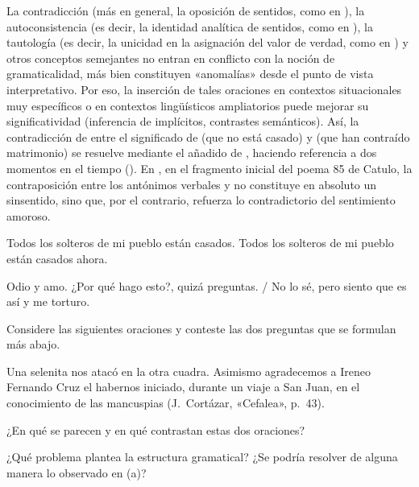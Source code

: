La contradicción (más en general, la oposición de sentidos, como en ), la autoconsistencia (es decir, la identidad
analítica de sentidos, como en ), la
tautología (es decir, la unicidad en la asignación del valor de verdad, como en
) y otros conceptos semejantes no entran en conflicto
con la noción de gramaticalidad, más bien constituyen «anomalías» desde el punto
de vista interpretativo. Por eso, la inserción de tales oraciones en contextos
situacionales muy específicos o en contextos lingüísticos ampliatorios puede
mejorar su significatividad (inferencia de implícitos, contrastes semánticos).
Así, la contradicción de  entre el significado de
 (que no está casado) y  (que han contraído
matrimonio) se resuelve mediante el añadido de 
, haciendo referencia a dos momentos en el tiempo
(). En
, en el fragmento inicial del poema 85 de Catulo, la
contraposición entre los antónimos verbales  y  no
constituye en absoluto un sinsentido, sino que, por el contrario, refuerza lo
contradictorio del sentimiento amoroso.

\begin{exe}
  \ex\label{ex:02-solteros}
    \begin{xlist}
      \ex\label{ex:02-solteros-a} Todos los solteros de mi pueblo están casados.
      \ex\label{ex:02-solteros-b} Todos los solteros de mi pueblo están casados
          ahora.
    \end{xlist}
  \ex\label{ex:02-catulo} Odio y amo. ¿Por qué hago esto?, quizá preguntas. / No
      lo sé, pero siento que es así y me torturo.
\end{exe}

\begin{ejercicio}\label{ej:02-referencia}
Considere las siguientes oraciones y conteste las dos preguntas que se formulan
más abajo.

\begin{exe}
  \ex Una selenita nos atacó en la otra cuadra.
  \ex Asimismo agradecemos a Ireneo Fernando Cruz el habernos iniciado, durante
      un viaje a San Juan, en el conocimiento de las mancuspias (J.~Cortázar,
      «Cefalea», p.~43).
\end{exe}

\begin{consignas}
  \item ¿En qué se parecen y en qué contrastan estas dos oraciones?
  \item ¿Qué problema plantea la estructura gramatical? ¿Se podría resolver de
        alguna manera lo observado en (a)?
\end{consignas}
\end{ejercicio}

